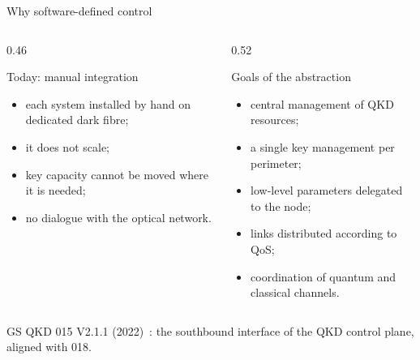 \documentclass[10pt]{beamer}
\begin{document}
\begin{frame}{Why software-defined control}
  \begin{columns}[T]
    \begin{column}{0.46\textwidth}
      \begin{alertblock}{Today: manual integration}
        \begin{itemize}
          \item each system installed by hand on dedicated dark fibre;
          \item it does not scale;
          \item key capacity cannot be moved where it is needed;
          \item no dialogue with the optical network.
        \end{itemize}
      \end{alertblock}
    \end{column}
    \begin{column}{0.52\textwidth}
      \begin{block}{Goals of the abstraction}
        \begin{itemize}
          \item central management of QKD resources;
          \item a single key management per perimeter;
          \item low-level parameters delegated to the node;
          \item links distributed according to QoS;
          \item coordination of quantum and classical channels.
        \end{itemize}
      \end{block}
    \end{column}
  \end{columns}
  \vspace{1ex}
  \centering\small GS QKD 015 V2.1.1 (2022)~\cite{qkd015}: the
  \alert{southbound interface} of the QKD control plane, aligned with 018.
\end{frame}
\end{document}
